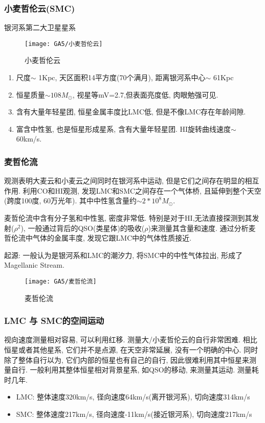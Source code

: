 \subsubsection{小麦哲伦云(SMC)}
银河系第二大卫星星系
\begin{figure}[!htb]
    \centering
    \texttt{[image: GA5/小麦哲伦云]}
    \caption{小麦哲伦云}
\end{figure}

\begin{enumerate}\small
    \item 尺度$\sim$ 1Kpc, 天区面积14平方度(70个满月), 距离银河系中心$\sim$ 61Kpc
    \item 恒星质量$\sim 10 8M_{\odot}$, 视星等mV=2.7,但表面亮度低, 肉眼勉强可见. 
    \item 含有大量年轻星团, 恒星金属丰度比LMC低, 但是不像LMC存在年龄间隙. 
    \item 富含中性氢, 也是恒星形成星系, 含有大量年轻星团. HI旋转曲线速度$\sim$ 60km/s. 
\end{enumerate}

\subsubsection{麦哲伦流}\small
观测表明大麦云和小麦云之间同时在银河系中运动, 但是它们之间存在明显的相互作用. 利用CO和HI观测, 发现LMC和SMC之间存在一个气体桥, 且延伸到整个天空(跨度100度, 60万光年). 其中中性氢含量约$\sim2*10^8M_{\odot}$. 

麦哲伦流中含有分子氢和中性氢, 密度非常低. 特别是对于HI,无法直接探测到其发射($\rho^2$), 一般通过背后的QSO(类星体)的吸收($\rho$)来测量其含量和速度. 通过分析麦哲伦流中气体的金属丰度, 发现它跟LMC中的气体性质接近. 

起源: 一般认为是银河系和LMC的潮汐力, 将SMC中的中性气体拉出, 形成了Magellanic Stream. 

\begin{figure}[!htb]
    \centering
    \texttt{[image: GA5/麦哲伦流]}
    \caption{麦哲伦流}
\end{figure}

\subsubsection{LMC 与 SMC的空间运动}

视向速度测量相对容易, 可以利用红移. 测量大/小麦哲伦云的自行非常困难. 相比恒星或者其他星系, 它们并不是点源, 在天空非常延展, 没有一个明确的中心. 同时除了整体自行以为, 它们内部的恒星也有自己的自行, 因此很难利用其中恒星来测量自行. 一般利用其整体恒星相对背景星系, 如QSO的移动, 来测量其运动. 测量耗时几年. 
\begin{itemize}
    \item LMC: 整体速度320km/s, 径向速度64km/s(离开银河系), 切向速度314km/s
    \item SMC: 整体速度217km/s, 径向速度-11km/s(接近银河系),  切向速度217km/s
\end{itemize}
\normalsize

